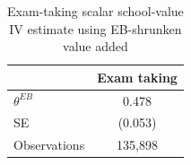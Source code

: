 \begin{table}[!htbp]
\centering
\caption{Exam-taking scalar school-value IV estimate using EB-shrunken value added}
\label{tab:scalar_school_value_iv_exam_taking_expected_va_eb}
\begin{tabular}{lc}
\toprule
 & Exam taking \\
\midrule
$\theta^{EB}$ & 0.478 \\
SE & (0.053) \\
Observations & 135,898 \\
\bottomrule
\end{tabular}
\end{table}
